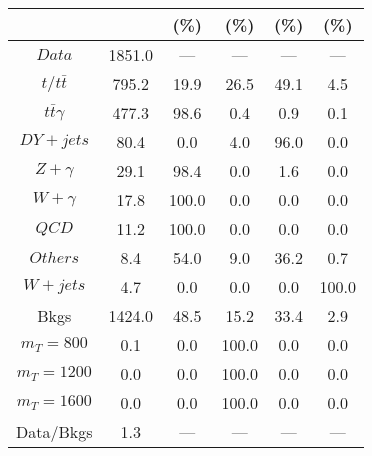 \begin{figure}
\begin{minipage}[c]{0.32\textwidth}
{\begin{tabular}{cccccc}
 &  & (\%) & (\%) & (\%) & (\%)  \\
\hline
                                                                      $ Data $ &  1851.0 &  --- &  --- &  --- &  ---\\
$ t/t\bar{t} $ &  795.2 &  19.9 &  26.5 &  49.1 &  4.5\\
$ t\bar{t}\gamma $ &  477.3 &  98.6 &  0.4 &  0.9 &  0.1\\
$ DY+jets $ &  80.4 &  0.0 &  4.0 &  96.0 &  0.0\\
$ Z+\gamma $ &  29.1 &  98.4 &  0.0 &  1.6 &  0.0\\
$ W+\gamma $ &  17.8 &  100.0 &  0.0 &  0.0 &  0.0\\
$ QCD $ &  11.2 &  100.0 &  0.0 &  0.0 &  0.0\\
$ Others $ &  8.4 &  54.0 &  9.0 &  36.2 &  0.7\\
$ W+jets $ &  4.7 &  0.0 &  0.0 &  0.0 &  100.0\\
Bkgs &  1424.0 &  48.5 &  15.2 &  33.4 &  2.9\\
$ m_{T} = 800 $ &  0.1 &  0.0 &  100.0 &  0.0 &  0.0\\
$ m_{T} = 1200 $ &  0.0 &  0.0 &  100.0 &  0.0 &  0.0\\
$ m_{T} = 1600 $ &  0.0 &  0.0 &  100.0 &  0.0 &  0.0\\
Data/Bkgs &  1.3 &  --- &  --- &  --- &  ---\\
\hline
\end{tabular}
}
\end{minipage}
\end{figure}

